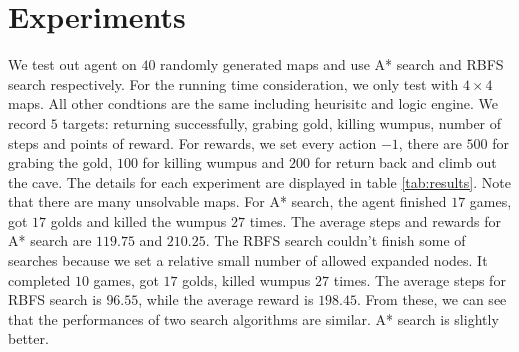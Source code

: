 \section{Experiments}\label{sec:exp}
We test out agent on $40$ randomly generated maps and use A* search and RBFS search respectively. For the running time consideration, we only test with $4 \times 4$ maps. All other condtions are the same including heurisitc and logic engine. We record $5$ targets: returning successfully, grabing gold, killing wumpus, number of steps and points of reward. For rewards, we set every action $-1$, there are $500$ for grabing the gold, $100$ for killing wumpus and $200$ for return back and climb
out the cave. The details for each experiment are displayed in table \ref{tab:results}. Note that there are many unsolvable maps. For A* search, the agent finished $17$ games, got $17$ golds and killed the wumpus $27$ times. The average steps and rewards for A* search are $119.75$ and $210.25$. The RBFS search couldn't finish some of searches because we set a relative small number of allowed expanded nodes. It completed $10$ games, got $17$ golds, killed wumpus $27$ times. The average steps for RBFS search is $96.55$, while the
average reward is $198.45$. From these, we can see that the performances of two search algorithms are similar. A* search is slightly better.

